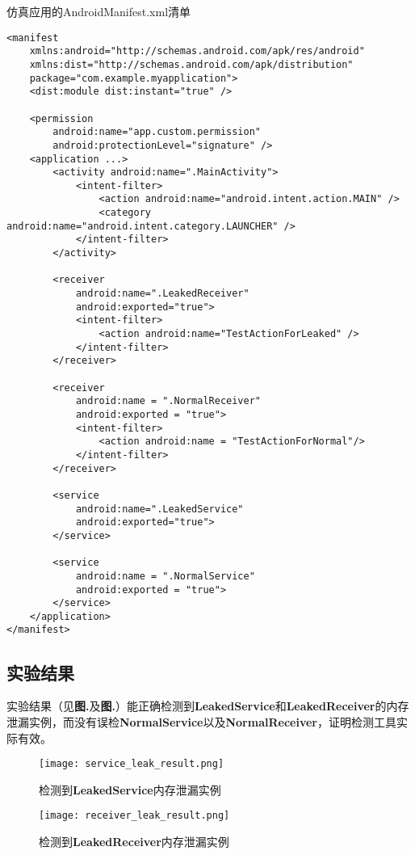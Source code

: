 \begin{listing}[htbp]
	\centering
	\caption{仿真应用的AndroidManifest.xml清单}
	\begin{verbatim}
<manifest
	xmlns:android="http://schemas.android.com/apk/res/android"
	xmlns:dist="http://schemas.android.com/apk/distribution"
	package="com.example.myapplication">
	<dist:module dist:instant="true" />

	<permission
		android:name="app.custom.permission"
		android:protectionLevel="signature" />
	<application ...>
		<activity android:name=".MainActivity">
			<intent-filter>
				<action android:name="android.intent.action.MAIN" />
				<category android:name="android.intent.category.LAUNCHER" />
			</intent-filter>
		</activity>
		
		<receiver
			android:name=".LeakedReceiver"
			android:exported="true">
			<intent-filter>
				<action android:name="TestActionForLeaked" />
			</intent-filter>
		</receiver>
		
		<receiver
			android:name = ".NormalReceiver"
			android:exported = "true">
			<intent-filter>
				<action android:name = "TestActionForNormal"/>
			</intent-filter>
		</receiver>
		
		<service
			android:name=".LeakedService"
			android:exported="true">
		</service>
	
		<service
			android:name = ".NormalService"
			android:exported = "true">
		</service>
	</application>
</manifest>
	\end{verbatim}
	\label{code: manifest}
\end{listing}

\subsection{实验结果}
实验结果（见\textbf{图.}\redbf{\ref{fig:result of mock receiver}}及\textbf{图.}\redbf{\ref{fig:result of mock service}}）能正确检测到\textbf{LeakedService}和\textbf{LeakedReceiver}的内存泄漏实例，而没有误检\textbf{NormalService}以及\textbf{NormalReceiver}，证明检测工具实际有效。

\begin{figure}[htbp]
	\centering
	\texttt{[image: service\_leak\_result.png]} %
	\caption{检测到\textbf{LeakedService}内存泄漏实例}
	\label{fig:result of mock service}
\end{figure}
\begin{figure}[htbp]
\centering
\texttt{[image: receiver\_leak\_result.png]} %
\caption{检测到\textbf{LeakedReceiver}内存泄漏实例}
\label{fig:result of mock receiver}
\end{figure}

